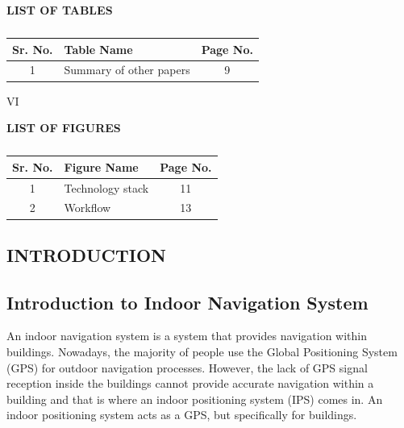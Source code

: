 ﻿\documentclass[a4paper, 12pt]{article}
\begin{document}
\begin{center}
\textbf{{\Large LIST OF TABLES}}
\end{center}

\begin{table}[h!]
    \centering
    \begin{tabular}{|c|l|c|}
    \hline
    Sr. No.& Table Name & Page No. \\
    \hline
    1 & Summary of other papers & 9\\
    \hline
    \end{tabular}
    \caption*{}
    \label{tab:my_label2}
\end{table}
\par
\newpage
\begin{center}
    VI
\end{center}

\begin{center}
\textbf{{\Large LIST OF FIGURES}}
\end{center}

\begin{table}[h!]
    \centering
    \begin{tabular}{|c|l|c|}
    \hline
    Sr. No.& Figure Name & Page No. \\
    \hline
1 & Technology stack & 11 \\
2 & Workflow & 13 \\
\hline

    \end{tabular}
    \caption*{}
    \label{tab:my_label2}
\end{table}

\newpage


\begin{center}
\section{INTRODUCTION}
\end{center}
\subsection{Introduction to Indoor Navigation System}
\par
An indoor navigation system is a system that provides navigation within buildings. Nowadays, the majority of people use the Global Positioning System (GPS) for outdoor navigation processes. However, the lack of GPS signal reception inside the buildings cannot provide accurate navigation within a building and that is where an indoor positioning system (IPS) comes in. An indoor positioning system acts as a GPS, but specifically for buildings.
 \\ 
\end{document}
